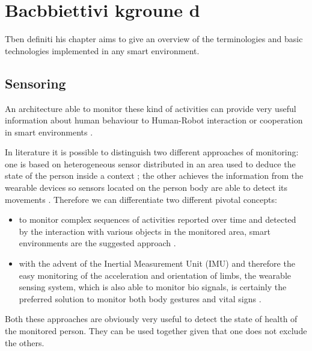 \documentclass{thesisreport}
\begin{document}
 \chapter{Bacbbiettivi kgroune d}
Tben definiti his chapter aims to give an overview of the terminologies and basic technologies implemented in any smart environment. 

 \section{Sensoring}
 An architecture able to monitor these kind of activities can provide very useful information about human behaviour to Human-Robot interaction or cooperation in smart environments \cite{bruno2014public}.  
 
 In literature it is possible to distinguish two different approaches of monitoring: one is based on heterogeneous sensor distributed in an area used to deduce the state of the person inside a context \cite{aggarwal2011human}; the other achieves the information from the wearable devices so sensors located on the person body are able to detect its movements  \cite{bao2004activity}. 
 Therefore we can differentiate two different pivotal concepts:
 \begin{itemize}
    \item to monitor complex sequences of activities reported over time and detected by the interaction with various objects in the monitored area, smart environments are the suggested approach \cite{scalmato2012describing}.
    \item with the advent of the Inertial Measurement Unit (IMU) and therefore the easy monitoring of the acceleration and orientation of limbs, the wearable sensing system, which is also able to monitor bio signals, is certainly the preferred solution to monitor both body gestures and vital signs \cite{bruno2013analysis}.
\end{itemize}
 
Both these approaches are obviously very useful to detect the state of health of the monitored person. They can be used together given that one does not exclude the others. 
\end{document}
